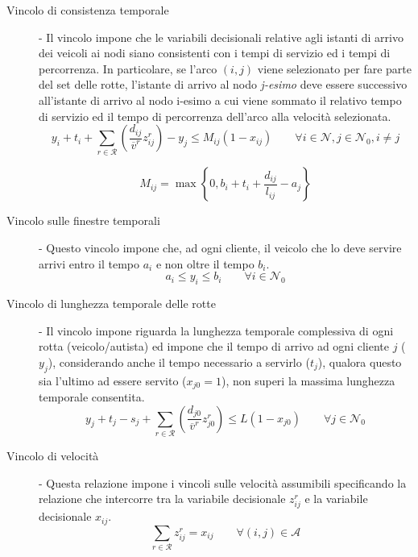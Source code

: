 \begin{description}
			\item[Vincolo di consistenza temporale]-
				Il vincolo impone che le variabili decisionali relative agli istanti di arrivo dei veicoli ai nodi siano consistenti con i tempi di servizio ed i tempi di percorrenza. In particolare, se l’arco $(i,j)$ viene selezionato per fare parte del set delle rotte, l’istante di arrivo al nodo \emph{j-esimo} deve essere successivo all’istante di arrivo al nodo i-esimo a cui viene sommato il relativo tempo di servizio ed il tempo di percorrenza dell’arco alla velocità selezionata.
				\begin{equation}
					\label{eq:temporal_consistency}
					y_i + t_i + 
					\sum_{r \in \mathcal{R}} \left(\frac{d_{ij}}{\overline v^r} z_{ij}^{r}\right) - 
					y_j \leq
					M_{ij}(1 - x_{ij})
					\qquad
					\forall i \in \mathcal{N}, j \in \mathcal{N}_0, i \neq j
				\end{equation}

				$$M_{ij} = \max \left\{ 0, b_i + t_i + \frac{d_{ij}} {l_{ij}} - a_j\right\}$$

			\item[Vincolo sulle finestre temporali]-
				Questo vincolo impone che, ad ogni cliente, il veicolo che lo deve servire arrivi entro il tempo $a_i$ e non oltre il tempo $b_i$.
				\begin{equation}
					\label{eq:time_windows}
					a_i \leq y_i \leq b_i
					\qquad
					\forall i \in \mathcal{N}_0
				\end{equation}

			\item[Vincolo di lunghezza temporale delle rotte]-
				Il vincolo impone riguarda la lunghezza temporale complessiva di ogni rotta (veicolo/autista) ed impone che il tempo di arrivo ad ogni cliente $j$ ($y_j$), considerando anche il tempo necessario a servirlo ($t_j$), qualora questo sia l'ultimo ad essere servito ($x_{j0}=1$), non superi la massima lunghezza temporale consentita.
				\begin{equation}
					\label{eq:total_temporal_constraint}
					y_j + t_j - s_j +
					\sum_{r \in \mathcal{R}}\left(\frac{d_{j0}}{\overline v^r}z_{j0}^{r}\right)
					\leq L(1-x_{j0})
					\qquad 
					\forall j \in \mathcal{N}_0
				\end{equation} 

			\item[Vincolo di velocità]-
				Questa relazione impone i vincoli sulle velocità assumibili specificando la relazione che intercorre tra la variabile decisionale $z_{ij}^r$ e la variabile decisionale $x_{ij}$.
				\begin{equation}
					\label{eq:speed_level_constraint}
					\sum_{r \in \mathcal{R}}z_{ij}^{r} = x_{ij} 
					\qquad
					\forall (i,j) \in \mathcal{A}
				\end{equation}
		\end{description}

